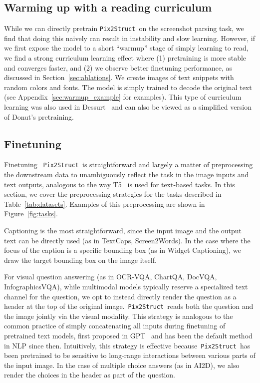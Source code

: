 \documentclass{article} %
\newcommand\ourmodel{{\texttt{Pix2Struct}}}
\begin{document}
\subsection{Warming up with a reading curriculum}
\label{sec:curriculum}
While we can directly pretrain \ourmodel~on the screenshot parsing task, we find that doing this naively can result in instability and slow learning. However, if we first expose the model to a short ``warmup'' stage of simply learning to read, we find a strong curriculum learning effect where (1) pretraining is more stable and converges faster, and (2) we observe better finetuning performance, as discussed in Section~\ref{sec:ablations}. We create images of text snippets with random colors and fonts. The model is simply trained to decode the original text (see Appendix~\ref{sec:warmup_example} for examples). This type of curriculum learning was also used in Dessurt~\citep{dessurt} and can also be viewed as a simplified version of Donut's pretraining.

\subsection{Finetuning}
\label{sec:finetuning}
Finetuning ~\ourmodel~is straightforward and largely a matter of preprocessing the downstream data to unambiguously reflect the task in the image inputs and text outputs, analogous to the way T5~\citep{t5} is used for text-based tasks. In this section, we cover the preprocessing strategies for the tasks described in Table~\ref{tab:datasets}. Examples of this preprocessing are shown in Figure~\ref{fig:tasks}.

Captioning is the most straightforward, since the input image and the output text can be directly used (as in TextCaps, Screen2Words). In the case where the focus of the caption is a specific bounding box (as in Widget Captioning), we draw the target bounding box on the image itself.

For visual question answering (as in OCR-VQA, ChartQA, DocVQA, InfographicsVQA), while multimodal models typically reserve a specialized text channel for the question, we opt to instead directly render the question as a header at the top of the original image.~\ourmodel~reads both the question and the image jointly via the visual modality. This strategy is analogous to the common practice of simply concatenating all inputs during finetuning of pretrained text models, first proposed in GPT~\citep{gpt} and has been the default method in NLP since then. Intuitively, this strategy is effective because~\ourmodel~has been pretrained to be sensitive to long-range interactions between various parts of the input image. 
In the case of multiple choice answers (as in AI2D), we also render the choices in the header as part of the question.
\end{document}
